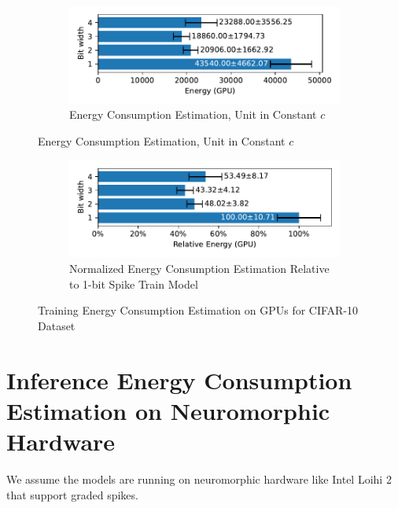         \begin{figure}[H]
            \centering
            \begin{subfigure}[H]{\textwidth}
                \includegraphics[width=\textwidth]{../standard/CIFAR10/plots/cifar10_train_energy_gpu_horizontal.pdf}
                \caption{Energy Consumption Estimation, Unit in Constant $c$}
            \end{subfigure}
        \end{figure}
        \begin{figure}[H]
            \centering
            \ContinuedFloat
            \begin{subfigure}[H]{\textwidth}
                \includegraphics[width=\textwidth]{../standard/CIFAR10/plots/cifar10_train_relative_energy_gpu_horizontal.pdf}
                \caption{Normalized Energy Consumption Estimation Relative to 1-bit Spike Train Model}
            \end{subfigure}
            \caption{Training Energy Consumption Estimation on GPUs for CIFAR-10 Dataset}
        \end{figure}

\section{Inference Energy Consumption Estimation on Neuromorphic Hardware}
\label{appendix:energy_neuromorphic}

    We assume the models are running on neuromorphic hardware like Intel Loihi 2 that support graded spikes. 

